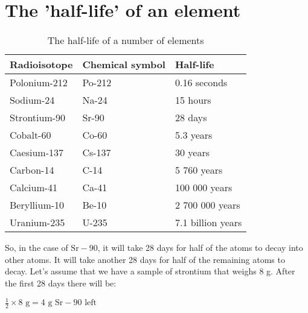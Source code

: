 



\section{The 'half-life' of an element}
\label{sec:an:halflife}



\begin{table}[!h]
\begin{center}
\begin{tabular}{|l|l|l|}\hline
\textbf{Radioisotope} & \textbf{Chemical symbol} & \textbf{Half-life}\\\hline
Polonium-212 & Po-212 & 0.16 seconds\\\hline
Sodium-24 & Na-24 & 15 hours\\\hline
Strontium-90 & Sr-90 & 28 days\\\hline
Cobalt-60 & Co-60 & 5.3 years\\\hline
Caesium-137 & Cs-137 & 30 years\\\hline
Carbon-14 & C-14 & 5 760 years\\\hline
Calcium-41 & Ca-41 & 100 000 years\\\hline
Beryllium-10 & Be-10 & 2 700 000 years\\\hline
Uranium-235 & U-235 & 7.1 billion years\\\hline
\end{tabular}
\caption{The half-life of a number of elements}
\label{tab:an:r}

\end{center}
\end{table}

So, in the case of $\text{Sr}-90$, it will take 28 days for half of the atoms to decay into other atoms. It will take another 28 days for half of the remaining atoms to decay. Let's assume that we have a sample of strontium that weighs 8 g. After the first 28 days there will be:

\begin{center}
$\frac{1}{2} \times 8 \text{ g} = 4 \text{ g Sr}-90 \text{ left}$
\end{center}

